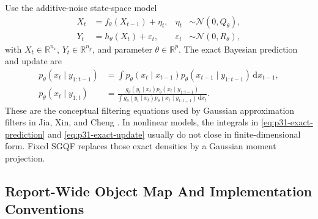 \documentclass[11pt]{article}
\numberwithin{equation}{section}
\newcommand{\R}{\mathbb R}
\newcommand{\N}{\mathcal N}
\newcommand{\dd}{\,\mathrm d}
\begin{document}
Use the additive-noise state-space model
\begin{align}
  X_t &= f_\theta(X_{t-1})+\eta_t,
  &
  \eta_t&\sim\N(0,Q_\theta),
  \label{eq:p31-state-model}\\
  Y_t &= h_\theta(X_t)+\varepsilon_t,
  &
  \varepsilon_t&\sim\N(0,R_\theta),
  \label{eq:p31-observation-model}
\end{align}
with \(X_t\in\R^{n_x}\), \(Y_t\in\R^{n_y}\), and parameter \(\theta\in\R^p\).
The exact Bayesian prediction and update are
\begin{align}
  p_\theta(x_t\mid y_{1:t-1})
  &=
  \int p_\theta(x_t\mid x_{t-1})
       p_\theta(x_{t-1}\mid y_{1:t-1})\dd x_{t-1},
  \label{eq:p31-exact-prediction}\\
  p_\theta(x_t\mid y_{1:t})
  &=
  \frac{
  g_\theta(y_t\mid x_t)
  p_\theta(x_t\mid y_{1:t-1})}
  {\int g_\theta(y_t\mid x_t)
  p_\theta(x_t\mid y_{1:t-1})\dd x_t}.
  \label{eq:p31-exact-update}
\end{align}
These are the conceptual filtering equations used by Gaussian approximation
filters in Jia, Xin, and Cheng \cite[Section 2]{jia2012sparsegrid}.  In
nonlinear models, the integrals in \eqref{eq:p31-exact-prediction} and
\eqref{eq:p31-exact-update} usually do not close in finite-dimensional form.
Fixed SGQF replaces those exact densities by a Gaussian moment projection.

\subsection{Report-Wide Object Map And Implementation Conventions}
\label{subsec:p32-object-map}
\end{document}
